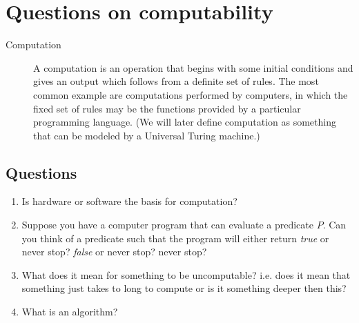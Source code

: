 \documentclass[12pt]{report}
\begin{document}
\section*{Questions on computability}

\begin{description}
\item[Computation] A computation is an operation that begins with some initial conditions and gives an output which follows from a definite set of rules. The most common example are computations performed by computers, in which the fixed set of rules may be the functions provided by a particular programming language. (We will later define computation as something that can be modeled by a Universal Turing machine.) 
\end{description}

\subsection*{Questions}

\begin{enumerate}

\item Is hardware or software the basis for computation?

\item Suppose you have a computer program that can evaluate a predicate $P$. Can you think of a predicate such that the program will either return \emph{true} or never stop? \emph{false} or never stop? never stop?

\item What does it mean for something to be uncomputable? i.e. does it mean that something just takes to long to compute or is it something deeper then this?

\item What is an algorithm?


\end{enumerate}
 
\end{document}
